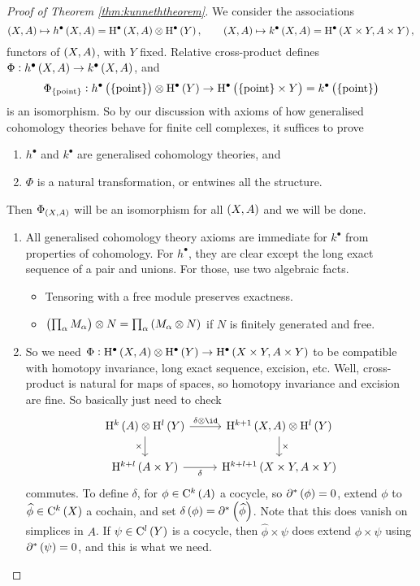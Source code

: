 \begin{proof}[Proof of Theorem \ref{thm:kunneththeorem}]
We consider the associations
$$ \br{X, A} \mapsto h^\bullet\br{X, A} = \H^\bullet\br{X, A} \otimes \H^\bullet\br{Y}, \qquad \br{X, A} \mapsto k^\bullet\br{X, A} = \H^\bullet\br{X \times Y, A \times Y}, $$
functors of $ \br{X, A} $, with $ Y $ fixed. Relative cross-product defines $ \Phi : h^\bullet\br{X, A} \to k^\bullet\br{X, A} $, and
$$ \Phi_{\pt} : h^\bullet\br{\pt} \otimes \H^\bullet\br{Y} \to \H^\bullet\br{\pt \times Y} = k^\bullet\br{\pt} $$
is an isomorphism. So by our discussion with axioms of how generalised cohomology theories behave for finite cell complexes, it suffices to prove
\begin{enumerate}
\item $ h^\bullet $ and $ k^\bullet $ are generalised cohomology theories, and
\item $ \Phi $ is a natural transformation, or entwines all the structure.
\end{enumerate}
Then $ \Phi_{\br{X, A}} $ will be an isomorphism for all $ \br{X, A} $ and we will be done.
\begin{enumerate}
\item All generalised cohomology theory axioms are immediate for $ k^\bullet $ from properties of cohomology. For $ h^\bullet $, they are clear except the long exact sequence of a pair and unions. For those, use two algebraic facts.
\begin{itemize}
\item Tensoring with a free module preserves exactness.
\item $ \br{\prod_\alpha M_\alpha} \otimes N = \prod_\alpha \br{M_\alpha \otimes N} $ if $ N $ is finitely generated and free.
\end{itemize}
\item So we need $ \Phi : \H^\bullet\br{X, A} \otimes \H^\bullet\br{Y} \to \H^\bullet\br{X \times Y, A \times Y} $ to be compatible with homotopy invariance, long exact sequence, excision, etc. Well, cross-product is natural for maps of spaces, so homotopy invariance and excision are fine. So basically just need to check
$$
\begin{tikzcd}
\H^k\br{A} \otimes \H^l\br{Y} \arrow{r}{\delta \otimes \id} \arrow{d}[swap]{\times} & \H^{k + 1}\br{X, A} \otimes \H^l\br{Y} \arrow{d}{\times} \\
\H^{k + l}\br{A \times Y} \arrow{r}[swap]{\delta} & \H^{k + l + 1}\br{X \times Y, A \times Y}
\end{tikzcd}
$$
commutes. To define $ \delta $, for $ \phi \in \C^k\br{A} $ a cocycle, so $ \da^*\br{\phi} = 0 $, extend $ \phi $ to $ \widehat{\phi} \in \C^k\br{X} $ a cochain, and set $ \delta\br{\phi} = \da^*\br{\widehat{\phi}} $. Note that this does vanish on simplices in $ A $. If $ \psi \in \C^l\br{Y} $ is a cocycle, then $ \widehat{\phi} \times \psi $ does extend $ \phi \times \psi $ using $ \da^*\br{\psi} = 0 $, and this is what we need.
\end{enumerate}
\end{proof}


